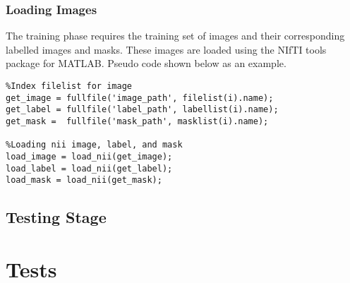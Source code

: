 \subsubsection{Loading Images} 
The training phase requires the training set of images and their corresponding labelled images and masks. These images are loaded using the NIfTI tools package \cite{ref:nifti_1} for MATLAB. Pseudo code shown below as an example. 
\begin{lstlisting}
%Index filelist for image
get_image = fullfile('image_path', filelist(i).name);
get_label = fullfile('label_path', labellist(i).name);
get_mask =  fullfile('mask_path', masklist(i).name);
    
%Loading nii image, label, and mask
load_image = load_nii(get_image);
load_label = load_nii(get_label);
load_mask = load_nii(get_mask); 
\end{lstlisting}



\subsection{Testing Stage}
\label{sect: teststage}

\section{Tests}